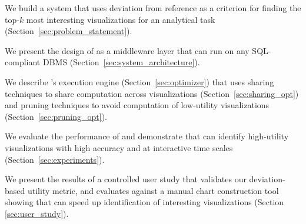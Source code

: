\begin{denselist}
  \item We build a system that uses deviation from reference as a criterion for finding the
  top-$k$ most interesting visualizations for an analytical task (Section~\ref{sec:problem_statement}).

  \item We present the design of \SeeDB as a middleware layer that can run on any SQL-compliant DBMS 
  (Section~\ref{sec:system_architecture}).
  
  \item We describe \SeeDB's execution engine (Section~\ref{sec:optimizer}) that uses
  sharing techniques to share computation 
  across visualizations (Section~\ref{sec:sharing_opt}) and
  pruning techniques to avoid computation of low-utility visualizations
  (Section~\ref{sec:pruning_opt}).
  

  \item We evaluate the performance of \SeeDB and demonstrate that \SeeDB
  can identify high-utility visualizations with high accuracy and at interactive time scales
  (Section~\ref{sec:experiments}).

  \item We present the results of a controlled user study that validates our deviation-based 
  utility metric, and evaluates \SeeDB against a manual chart construction tool 
  showing that \SeeDB can speed up identification of interesting 
  visualizations (Section \ref{sec:user_study}).

\end{denselist}

